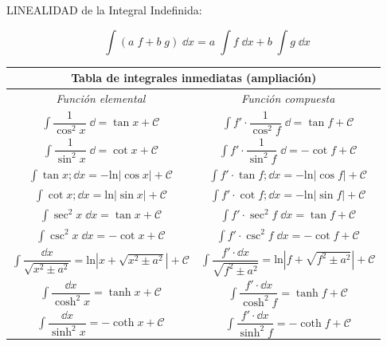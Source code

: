 LINEALIDAD  de la Integral Indefinida:

\begin{equation*}
	 \displaystyle \int \left(a\; f + b \; g \right) \; \dd x =  a \; \displaystyle \int f\; \dd x + b\; \displaystyle \int g \; \dd x
\end{equation*}

\begin{table}[H]
\centering
\def\arraystretch{2}
\begin{tabular}{|c|c|}
\hline
\multicolumn{2}{|c|}{Tabla de integrales inmediatas (ampliación)} \\ \hline
      \emph{Función elemental} & 	\emph{Función compuesta}      \\ \hline
  $\displaystyle \int \dfrac {1}{\cos^2 x} \; \dd = \tan x+\mathcal{C}$    &   $\displaystyle \int f' \cdot \dfrac {1}{\cos^2 f} \; \dd = \tan f+\mathcal{C}$     \\ \hline
    $\displaystyle \int \dfrac {1}{\sin^2 x} \; \dd = \cot x+\mathcal{C}$    &   $\displaystyle \int f' \cdot \dfrac {1}{\sin^2 f} \; \dd = -\cot f+\mathcal{C}$     \\ \hline
    $\displaystyle \int \tan x ; \dd x= -\mathrm{ln}|\cos x|+\mathcal{C}$           &   $\displaystyle \int f'\cdot \tan f ; \dd x= -\mathrm{ln}|\cos f|+\mathcal{C}$       \\ \hline
    $\displaystyle \int \cot x ; \dd x= \mathrm{ln}|\sin x|+\mathcal{C}$           &   $\displaystyle \int f'\cdot \cot f ; \dd x= -\mathrm{ln}|\sin f|+\mathcal{C}$       \\ \hline
      $\displaystyle \int \sec^2 x \; \dd x= \tan x + \mathcal{C}$           &   $\displaystyle \int f' \cdot  \sec^2 f \; \dd x= \tan f + \mathcal{C}$       \\ \hline
        $\displaystyle \int \csc^2 x \; \dd x= -\cot x + \mathcal{C}$           &   $\displaystyle \int f' \cdot  \csc^2 f \; \dd x=- \cot f + \mathcal{C}$       \\ \hline
       $\displaystyle \int \dfrac {\dd x}{\sqrt{x^2 \pm a^2}}  = \mathrm {ln} |x+\sqrt{x^2\pm a^2}|+ \mathcal{C} $       &     $\displaystyle \int \dfrac {f'\cdot \dd x}{\sqrt{f^2 \pm a^2}}  = \mathrm {ln} |f+\sqrt{f^2\pm a^2}|+ \mathcal{C} $      \\ \hline
      $\displaystyle \int \dfrac {\dd x}{\cosh^2 x} = \tanh x + \mathcal{C} $          &    $\displaystyle \int \dfrac {f'\cdot \dd x}{\cosh^2 f} = \tanh f + \mathcal{C} $     \\ \hline
       $\displaystyle \int \dfrac {\dd x}{\sinh^2 x} = -\coth x + \mathcal{C} $          &    $\displaystyle \int \dfrac {f'\cdot \dd x}{\sinh^2 f} = -\coth f + \mathcal{C} $     \\ \hline

\end{tabular}
\end{table}
